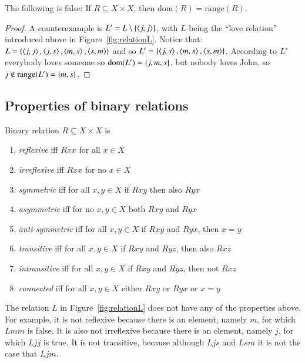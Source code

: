 \documentclass[nobib,nofonts]{tufte-handout}
\begin{document}
\begin{claim}
  The following is false: If $R \subseteq X \times X$, then $\text{dom}(R) = \text{range}(R)$.
\end{claim}

\begin{proof}
A counterexample is $L' = L \setminus \left\{\left \langle j,j\right\rangle\right\}$, with $L$ being the ``love relation'' introduced
above in Figure~\ref{fig:relationL}. Notice that: $L = \left\{\left \langle j,j\right\rangle, \left \langle j,s\right\rangle,
  \left \langle m,s\right\rangle, \left \langle s,m\right\rangle\right\}$ and so $L' = \left\{\left \langle j,s\right\rangle, \left \langle m,s\right\rangle,
  \left \langle s,m\right\rangle\right\}$. According to $L'$ everybody loves someone so $\text{dom}(L') = \left\{j,m,s\right\}$,
but nobody loves John, so $j \not \in \text{range}(L') = \left\{m,s\right\}$.
\end{proof}


\subsection{Properties of binary relations}

Binary relation $R \subseteq X \times X$ is
\begin{enumerate}
\item[] \emph{reflexive} iff $Rxx$ for all $x \in X$
\item[] \emph{irreflexive} iff $Rxx$ for no $x \in X$
\item[] \emph{symmetric} iff for all $x,y \in X$ if $Rxy$ then also $Ryx$
\item[] \emph{asymmetric} iff for no $x,y \in X$ both $Rxy$ and $Ryx$
\item[] \emph{anti-symmetric} iff for all $x,y \in X$ if $Rxy$ and $Ryx$, then $x = y$
\item[] \emph{transitive} iff for all $x,y \in X$ if $Rxy$ and $Ryz$, then also $Rxz$
\item[] \emph{intransitive} iff for all $x,y \in X$ if $Rxy$ and $Ryz$, then not $Rxz$
\item[] \emph{connected} iff for all $x,y \in X$ either $Rxy$ or $Ryx$ or $x = y$
\end{enumerate}

The relation $L$ in Figure~\ref{fig:relationL} does not have any of the properties above.
For example, it is not reflexive because there is an element, namely $m$, for which $Lmm$ is false.
It is also not irreflexive because there is an element, namely $j$, for which $Ljj$ is true.
It is not transitive, because although $Ljs$ and $Lsm$ it is not the case that $Ljm$.
\end{document}
